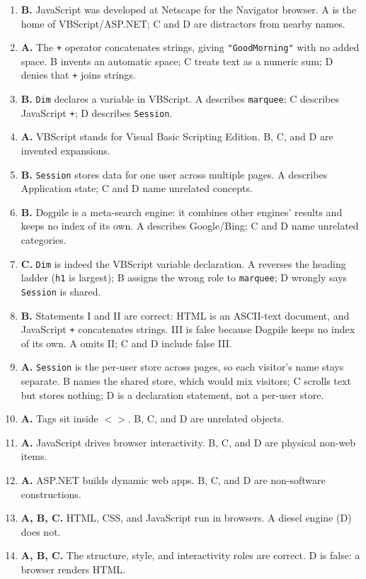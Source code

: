 \documentclass[11pt]{article}
\begin{document}
\begin{enumerate}[label=\textbf{Q\arabic*.}, leftmargin=*]
  each runs; D claims they are the same language.
\item \textbf{B.} JavaScript was developed at Netscape for the Navigator
  browser. A is the home of VBScript/ASP.NET; C and D are distractors from
  nearby names.
\item \textbf{A.} The \texttt{+} operator concatenates strings, giving
  \texttt{"GoodMorning"} with no added space. B invents an automatic space; C
  treats text as a numeric sum; D denies that \texttt{+} joins strings.
\item \textbf{B.} \texttt{Dim} declares a variable in VBScript. A describes
  \texttt{marquee}; C describes JavaScript \texttt{+}; D describes
  \texttt{Session}.
\item \textbf{A.} VBScript stands for Visual Basic Scripting Edition. B, C,
  and D are invented expansions.
\item \textbf{B.} \texttt{Session} stores data for one user across multiple
  pages. A describes Application state; C and D name unrelated concepts.
\item \textbf{B.} Dogpile is a meta-search engine: it combines other engines'
  results and keeps no index of its own. A describes Google/Bing; C and D name
  unrelated categories.
\item \textbf{C.} \texttt{Dim} is indeed the VBScript variable declaration.
  A reverses the heading ladder (\texttt{h1} is largest); B assigns the wrong
  role to \texttt{marquee}; D wrongly says \texttt{Session} is shared.
\item \textbf{B.} Statements I and II are correct: HTML is an ASCII-text
  document, and JavaScript \texttt{+} concatenates strings. III is false
  because Dogpile keeps no index of its own. A omits II; C and D include false
  III.
\item \textbf{A.} \texttt{Session} is the per-user store across pages, so each
  visitor's name stays separate. B names the shared store, which would mix
  visitors; C scrolls text but stores nothing; D is a declaration statement,
  not a per-user store.

\item \textbf{A.} Tags sit inside $< >$. B, C, and D are unrelated objects.
\item \textbf{A.} JavaScript drives browser interactivity. B, C, and D are physical non-web items.
\item \textbf{A.} ASP.NET builds dynamic web apps. B, C, and D are non-software constructions.
\item \textbf{A, B, C.} HTML, CSS, and JavaScript run in browsers. A diesel engine (D) does not.
\item \textbf{A, B, C.} The structure, style, and interactivity roles are correct. D is false: a browser renders HTML.
\end{enumerate}
\def\JKSSBLessonID{63}\def\JKSSBAnswers{1}
\end{document}
